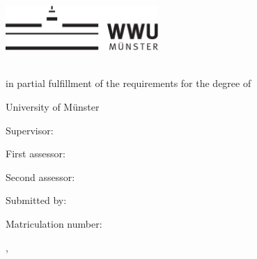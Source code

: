 \thispagestyle{empty}

\begin{center}
    \includegraphics[height=1.7cm]{logos/wwu.pdf}
    \hfill

    \par
    \vspace*{8ex}
    {
        \linespread{0.9}
        \LARGE
        \printtitle
        \par
    }
    \normalsize
    \vspace*{8ex}
    \large
    \textsc{\printtype}\\
    \normalsize
    in partial fulfillment of the requirements for the degree of\\
    \large
    \textsc{\printdegree}
    \par
    \normalsize
    \vspace*{6ex}
    University of Münster\\
    \printinstitute
\end{center}

\par
\vspace*{4ex}
Supervisor:\\
\large
\textit{\printsupervisor}

\par
\normalsize
\vspace*{2ex}
First assessor:\\
\large
\textit{\printfirstassessor}

\par
\normalsize
\vspace*{2ex}
Second assessor:\\
\large
\textit{\printsecondassessor}

\par
\normalsize
\vspace*{2ex}
Submitted by:\\
\large
\textit{\printname}

\par
\normalsize
\vspace*{2ex}
Matriculation number:\\
\large
\textit{\printnumber}

\par
\normalsize
\vspace*{4ex}
\printcity, \makeatletter
\monthname
\makeatother~\the\year
